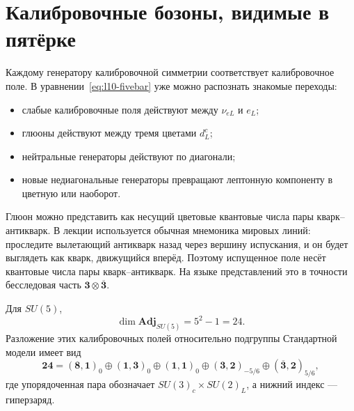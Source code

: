 \section{Калибровочные бозоны, видимые в пятёрке}

Каждому генератору калибровочной симметрии соответствует калибровочное поле. В уравнении~\eqref{eq:l10-fivebar} уже можно распознать знакомые переходы:
\begin{itemize}
\item слабые калибровочные поля действуют между \(\nu_{eL}\) и \(e_L\);
\item глюоны действуют между тремя цветами \(d^c_L\);
\item нейтральные генераторы действуют по диагонали;
\item новые недиагональные генераторы превращают лептонную компоненту в цветную или наоборот.
\end{itemize}

Глюон можно представить как несущий цветовые квантовые числа пары кварк--антикварк. В лекции используется обычная мнемоника мировых линий: проследите вылетающий антикварк назад через вершину испускания, и он будет выглядеть как кварк, движущийся вперёд. Поэтому испущенное поле несёт квантовые числа пары кварк--антикварк. На языке представлений это в точности бесследовая часть \(\mathbf3\otimes\overline{\mathbf3}\).

Для \(SU(5)\),
\begin{equation}
\dim\mathbf{Adj}_{SU(5)}=5^2-1=24.
\end{equation}
Разложение этих калибровочных полей относительно подгруппы Стандартной модели имеет вид
\begin{equation}
\mathbf{24}
=
(\mathbf8,\mathbf1)_0
\oplus(\mathbf1,\mathbf3)_0
\oplus(\mathbf1,\mathbf1)_0
\oplus(\mathbf3,\mathbf2)_{-5/6}
\oplus(\overline{\mathbf3},\mathbf2)_{5/6},
\label{eq:l10-adjoint-sm}
\end{equation}
где упорядоченная пара обозначает \(SU(3)_c\times SU(2)_L\), а нижний индекс — гиперзаряд.


